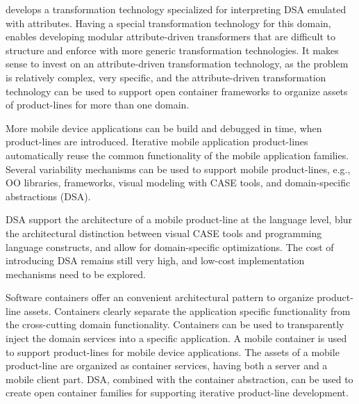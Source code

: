 \noindent {} develops a transformation technology specialized for interpreting DSA emulated with attributes. Having a special transformation technology for this domain, enables developing modular attribute-driven transformers that are difficult to structure and enforce with more generic transformation technologies. It makes sense to invest on an attribute-driven transformation technology, as the problem is relatively complex,  very specific, and the attribute-driven transformation technology can be used to support open container frameworks to organize assets of product-lines for more than one domain. %

\label{ch2sum}


More mobile device applications can be build and debugged in time, when product-lines are introduced. Iterative mobile application product-lines automatically reuse the common functionality of the mobile application families. Several variability mechanisms can be used to support mobile product-lines, e.g., OO libraries, frameworks, visual modeling with CASE tools, and domain-specific abstractions (DSA). 

DSA support the architecture of a mobile product-line at the language level, blur the architectural distinction between visual CASE tools and programming language constructs, and allow for domain-specific optimizations. The cost of introducing DSA remains still very high, and low-cost implementation mechanisms need to be explored. 

Software containers offer an convenient architectural pattern to organize product-line assets. Containers clearly separate the application specific functionality from the cross-cutting domain functionality. Containers can be used to transparently inject the domain services into a specific application. A mobile container is used to support product-lines for mobile device applications. The assets of a mobile product-line are organized as container services, having both a server and a mobile client part. DSA, combined with the container abstraction, can be used to create open container families for supporting iterative product-line development.

